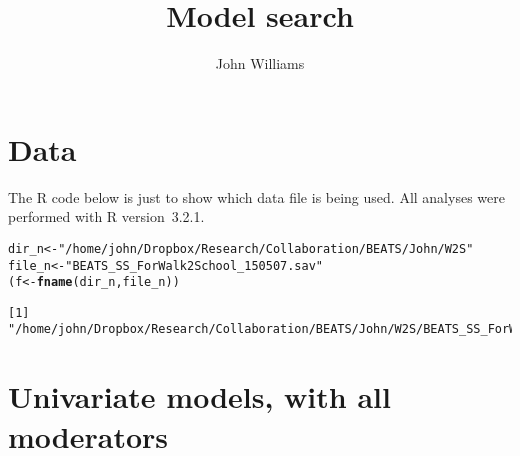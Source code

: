\documentclass[a4paper]{article}\usepackage[]{graphicx}\usepackage[]{color}
\title{Model search}
\author{John Williams}
\makeatletter
\newcommand{\hlstr}[1]{\textcolor[rgb]{0.192,0.494,0.8}{#1}}%
\newcommand{\hlstd}[1]{\textcolor[rgb]{0.345,0.345,0.345}{#1}}%
\newcommand{\hlkwb}[1]{\textcolor[rgb]{0.69,0.353,0.396}{#1}}%
\newcommand{\hlkwd}[1]{\textcolor[rgb]{0.737,0.353,0.396}{\textbf{#1}}}%
\newenvironment{kframe}{%
 \def\at@end@of@kframe{}%
 \ifinner\ifhmode%
  \def\at@end@of@kframe{\end{minipage}}%
  \begin{minipage}{\columnwidth}%
 \fi\fi%
 \def\FrameCommand##1{\hskip\@totalleftmargin \hskip-\fboxsep
 \colorbox{shadecolor}{##1}\hskip-\fboxsep
     \hskip-\linewidth \hskip-\@totalleftmargin \hskip\columnwidth}%
 \MakeFramed {\advance\hsize-\width
   \@totalleftmargin\z@ \linewidth\hsize
   \@setminipage}}%
 {\par\unskip\endMakeFramed%
 \at@end@of@kframe}
\newenvironment{knitrout}{}{} %
\makeatother
\begin{document}
\maketitle


\section{Data}
The \textsf{R} code below is just to show which data file is being used. All
analyses were performed with R version~3.2.1.

\begin{knitrout}\small
{}\color{fgcolor}\begin{kframe}
\begin{alltt}
\hlstd{dir_n} \hlkwb{<-} \hlstr{"/home/john/Dropbox/Research/Collaboration/BEATS/John/W2S"}
\hlstd{file_n} \hlkwb{<-} \hlstr{"BEATS_SS_ForWalk2School_150507.sav"}
\hlstd{(f} \hlkwb{<-} \hlkwd{fname}\hlstd{(dir_n, file_n))}
\end{alltt}
\begin{verbatim}
[1] "/home/john/Dropbox/Research/Collaboration/BEATS/John/W2S/BEATS_SS_ForWalk2School_150507.sav"
\end{verbatim}
\end{kframe}
\end{knitrout}

\begin{knitrout}
\color{fgcolor}\begin{kframe}


{\ttfamily\noindent\bfseries{}}\end{kframe}
\end{knitrout}

\section{Univariate models, with all moderators}
\begin{knitrout}
\color{fgcolor}\begin{kframe}


{\ttfamily\noindent\bfseries\color{errorcolor}{Error in eval(expr, envir, enclos): object 'dat.ats' not found}}

{\ttfamily\noindent\bfseries\color{errorcolor}{Error in datadist(dat\_m1): object 'dat\_m1' not found}}

{\ttfamily\noindent\bfseries{}}\end{kframe}
\end{knitrout}
\end{document}
